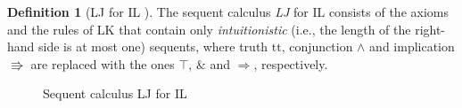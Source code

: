 \documentclass[a4paper]{article}
\theoremstyle{definition}
\newtheorem{definition}{Definition}[section]
\theoremstyle{theorem}
\theoremstyle{remark}
\begin{document}
\begin{definition}[\textsf{LJ} for IL \cite{gentzen1935untersuchungen,troelstra2000basic}]
\label{DefLJ}
The sequent calculus \emph{\textsf{LJ}} for IL consists of the axioms and the rules of \textsf{LK} that contain only \emph{intuitionistic} (i.e., the length of the right-hand side is at most one) sequents, where truth $\mathrm{tt}$, conjunction $\wedge$ and implication $\Rrightarrow$ are replaced with the ones $\top$, $\&$ and $\Rightarrow$, respectively.
\begin{figure}
\begin{center}
\end{center}
\caption{Sequent calculus \textsf{LJ} for IL}
\label{FigLJ}
\end{figure}
\fi
\end{definition}
\end{document}
